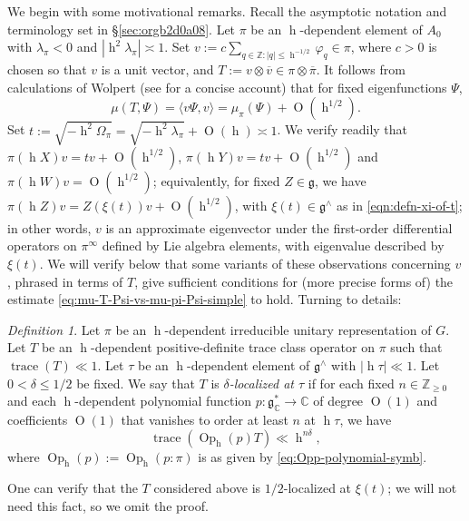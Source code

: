 \documentclass[reqno,10pt]{amsart}
\theoremstyle{plain} %
\theoremstyle{definition}
\theoremstyle{plain} %
\theoremstyle{remark}
\newtheorem*{definition*}  {Definition}
\theoremstyle{itplain} %
\theoremstyle{remark} %
\renewcommand{\geq}{\geqslant}
\renewcommand{\leq}{\leqslant}
\numberwithin{equation}{section}
\DeclareMathOperator{\trace}{trace}
\def\O{\operatorname{O}}
\DeclareMathOperator{\Opp}{Op}
\DeclareMathOperator{\h}{h}
\begin{document}
We begin with some motivational remarks.  Recall the asymptotic notation and terminology set in \S\ref{sec:orgb2d0a08}.  Let $\pi$ be an $\h$-dependent element of $A_0$ with $\lambda_\pi < 0$ and $|\h^2 \lambda_\pi| \asymp 1$.  Set $v := c \sum_{q \in \mathbb{Z} : |q| \leq \h^{-1/2}} \varphi_q \in \pi$, where $c > 0$ is chosen so that $v$ is a unit vector, and $T := v \otimes \overline{v} \in \pi \otimes \overline{\pi}$.  It follows from calculations of Wolpert \cite[\S5]{MR1838659} (see \cite[\S3]{MR1859345} for a concise account) that for fixed eigenfunctions $\Psi$,
\begin{equation}\label{eq:mu-T-Psi-vs-mu-pi-Psi-simple}
  \mu(T,\Psi)
  =
  \langle v \Psi, v \rangle
  =
  \mu_\pi(\Psi)
  + \O(\h^{1/2}).
\end{equation}
Set $t := \sqrt{- \h^2 \Omega_\pi } = \sqrt{- \h^2 \lambda_\pi } + \O(\h) \asymp 1$.  We verify readily that $\pi(\h X) v = t v + \O(\h^{1/2})$, $\pi(\h Y) v = t v + \O(\h^{1/2})$ and $\pi(\h W) v = \O(\h^{1/2})$; equivalently, for fixed $Z \in \mathfrak{g}$, we have $\pi(\h Z) v = Z(\xi(t)) v + \O(\h^{1/2})$, with $\xi(t) \in \mathfrak{g}^\wedge$ as in \eqref{eqn:defn-xi-of-t}; in other words, $v$ is an approximate eigenvector under the first-order differential operators on $\pi^\infty$ defined by Lie algebra elements, with eigenvalue described by $\xi(t)$.  We will verify below that some variants of these observations concerning $v$, phrased in terms of $T$, give sufficient conditions for (more precise forms of) the estimate \eqref{eq:mu-T-Psi-vs-mu-pi-Psi-simple} to hold.  Turning to details:
\begin{definition*}
  Let $\pi$ be an $\h$-dependent irreducible unitary representation of $G$.  Let $T$ be an $\h$-dependent positive-definite trace class operator on $\pi$ such that $\trace(T) \ll 1$.  Let $\tau$ be an $\h$-dependent element of $\mathfrak{g}^\wedge$ with $|\h \tau| \ll 1$.  Let $0 < \delta \leq 1/2$ be fixed.  We say that $T$ is \emph{$\delta$-localized at $\tau$} if for each fixed $n \in \mathbb{Z}_{\geq 0}$ and each $\h$-dependent polynomial function $p : \mathfrak{g}_\mathbb{C}^* \rightarrow \mathbb{C}$ of degree $\O(1)$ and coefficients $\O(1)$ that vanishes to order at least $n$ at $\h \tau$, we have
  \begin{equation}
    \trace(\Opp_{\h}(p) T) \ll \h^{n \delta},
  \end{equation}
  where $\Opp_{\h}(p) := \Opp_{\h}(p:\pi)$ is as given by \eqref{eq:Opp-polynomial-symb}.
\end{definition*}
One can verify that the $T$ considered above is $1/2$-localized at $\xi(t)$; we will not need this fact, so we omit the proof.
\end{document}
